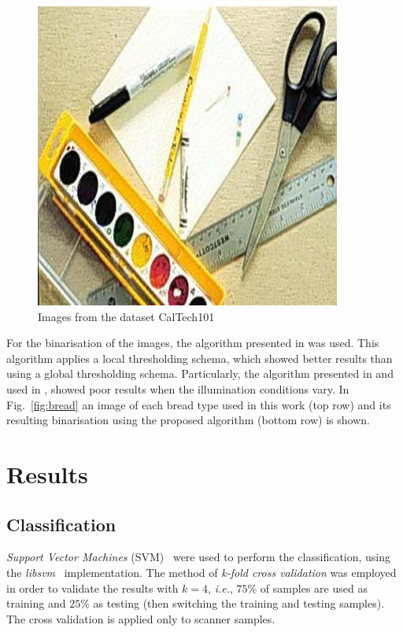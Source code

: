 \documentclass[oneside,a4paper,english,links]{article}
\begin{document}
\begin{figure}[htb]
\includegraphics[scale=0.20]{imagenes/image_0048}
\caption{Images from the dataset CalTech101}
\label{fig:nonbread}
\end{figure}

For the binarisation of the images, the algorithm presented in \cite{White83} was used. This algorithm applies a local thresholding schema, which showed better results than using a global thresholding schema. Particularly, the algorithm presented in \cite{Huang95} and used in \cite{Gonzales2008}, showed poor results when the illumination conditions vary. In Fig.~\ref{fig:bread} an image of each bread type used in this work (top row) and its resulting binarisation using the proposed algorithm (bottom row) is shown.  

\section{Results}

\subsection{Classification}
{\em Support Vector Machines} (SVM)~\cite{Boser92} were used to perform the classification, using the {\em libsvm}~\cite{Chang2011} implementation. The method of {\em k-fold cross validation} was employed in order to validate the results with $k = 4$, {\em i.e.}, $75\%$ of samples are used as training and $25\%$ as testing (then switching the training and testing samples). The cross validation is applied only to scanner samples.
\end{document}

